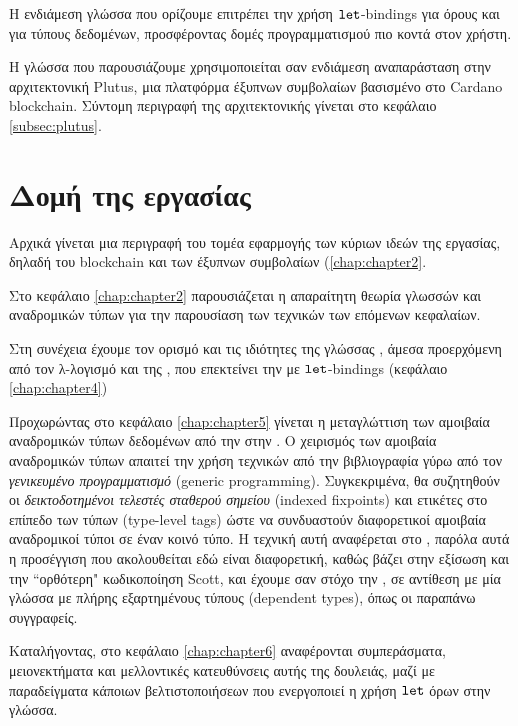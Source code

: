   Η ενδιάμεση γλώσσα που ορίζουμε επιτρέπει την χρήση $\operatorname{\texttt{let}}$-bindings για όρους και για τύπους δεδομένων,
  προσφέροντας δομές προγραμματισμού πιο κοντά στον χρήστη.

  Η γλώσσα που παρουσιάζουμε χρησιμοποιείται σαν ενδιάμεση αναπαράσταση στην αρχιτεκτονική Plutus,
  μια πλατφόρμα έξυπνων συμβολαίων βασισμένο στο Cardano blockchain. Σύντομη περιγραφή της
  αρχιτεκτονικής γίνεται στο κεφάλαιο \ref{subsec:plutus}.

  \section{Δομή της εργασίας}

  Αρχικά γίνεται μια περιγραφή του τομέα εφαρμογής των κύριων ιδεών της εργασίας,
  δηλαδή του blockchain και των έξυπνων συμβολαίων (\ref{chap:chapter2}.

     Στο κεφάλαιο \ref{chap:chapter2}  παρουσιάζεται η απαραίτητη θεωρία γλωσσών και αναδρομικών τύπων
      για την παρουσίαση των τεχνικών των επόμενων κεφαλαίων.

      Στη συνέχεια έχουμε τον ορισμό και τις ιδιότητες της γλώσσας \FOMF{}, άμεσα προερχόμενη από
      τον λ-λογισμό και της \FIR{}, που επεκτείνει την \FOMF{} με $\operatorname{\texttt{let}}$-bindings (κεφάλαιο \ref{chap:chapter4})

        Προχωρώντας στο κεφάλαιο \ref{chap:chapter5} γίνεται η μεταγλώττιση των αμοιβαία αναδρομικών τύπων
        δεδομένων από την \FIR{} στην \FOMF{}. Ο χειρισμός των αμοιβαία αναδρομικών τύπων απαιτεί
        την χρήση τεχνικών από την βιβλιογραφία γύρω από τον \emph{γενικευμένο προγραμματισμό} (generic
          programming). Συγκεκριμένα, θα  συζητηθούν οι \emph{δεικτοδοτημένοι τελεστές σταθερού σημείου}
        (indexed fixpoints) και ετικέτες στο επίπεδο των τύπων (type-level tags) ώστε να συνδυαστούν
        διαφορετικοί αμοιβαία αναδρομικοί τύποι σε έναν κοινό τύπο. Η τεχνική αυτή αναφέρεται στο
        \cite{fixmutualgeneric}, παρόλα αυτά η προσέγγιση που ακολουθείται εδώ είναι διαφορετική,
        καθώς βάζει στην εξίσωση και την ``ορθότερη" κωδικοποίηση Scott, και έχουμε σαν στόχο την \FOMF{},
        σε αντίθεση με μία γλώσσα με πλήρης εξαρτημένους τύπους (dependent types), όπως οι παραπάνω
        συγγραφείς.

       Καταλήγοντας,  στο κεφάλαιο \ref{chap:chapter6} αναφέρονται  συμπεράσματα, μειονεκτήματα και μελλοντικές κατευθύνσεις αυτής της δουλειάς, μαζί με παραδείγματα κάποιων βελτιστοποιήσεων που ενεργοποιεί η
        χρήση $\operatorname{\texttt{let}}$ όρων στην γλώσσα.

